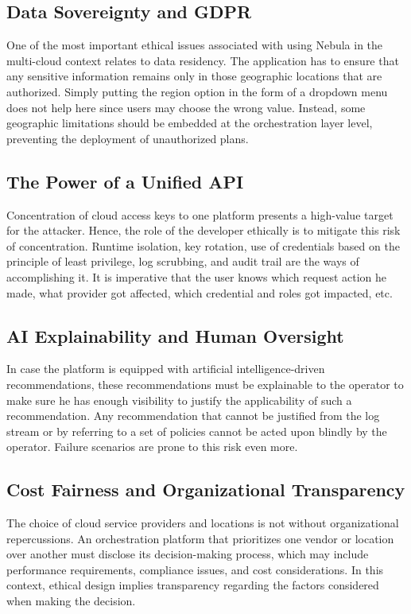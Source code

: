 \subsection{Data Sovereignty and GDPR}
One of the most important ethical issues associated with using Nebula in the multi-cloud context relates to data residency. The application has to ensure that any sensitive information remains only in those geographic locations that are authorized. Simply putting the region option in the form of a dropdown menu does not help here since users may choose the wrong value. Instead, some geographic limitations should be embedded at the orchestration layer level, preventing the deployment of unauthorized plans.


\subsection{The Power of a Unified API}
Concentration of cloud access keys to one platform presents a high-value target for the attacker. Hence, the role of the developer ethically is to mitigate this risk of concentration. Runtime isolation, key rotation, use of credentials based on the principle of least privilege, log scrubbing, and audit trail are the ways of accomplishing it. It is imperative that the user knows which request action he made, what provider got affected, which credential and roles got impacted, etc.

\subsection{AI Explainability and Human Oversight}
In case the platform is equipped with artificial intelligence-driven recommendations, these recommendations must be explainable to the operator to make sure he has enough visibility to justify the applicability of such a recommendation. Any recommendation that cannot be justified from the log stream or by referring to a set of policies cannot be acted upon blindly by the operator. Failure scenarios are prone to this risk even more.


\subsection{Cost Fairness and Organizational Transparency}
The choice of cloud service providers and locations is not without organizational repercussions. An orchestration platform that prioritizes one vendor or location over another must disclose its decision-making process, which may include performance requirements, compliance issues, and cost considerations. In this context, ethical design implies transparency regarding the factors considered when making the decision.

